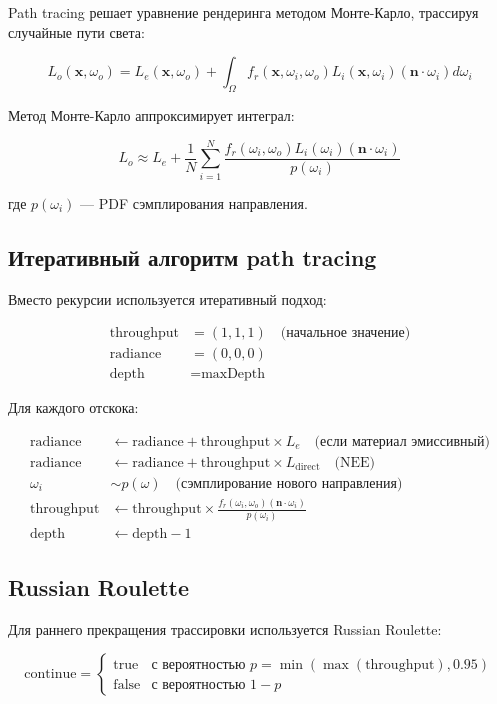 \documentclass[14pt, a4paper]{extarticle}
\begin{document}
Path tracing решает уравнение рендеринга методом Монте-Карло, трассируя случайные пути света:

\[
L_o(\mathbf{x}, \omega_o) = L_e(\mathbf{x}, \omega_o) + \int_{\Omega} f_r(\mathbf{x}, \omega_i, \omega_o) L_i(\mathbf{x}, \omega_i) (\mathbf{n} \cdot \omega_i) d\omega_i
\]

Метод Монте-Карло аппроксимирует интеграл:

\[
L_o \approx L_e + \frac{1}{N} \sum_{i=1}^{N} \frac{f_r(\omega_i, \omega_o) L_i(\omega_i) (\mathbf{n} \cdot \omega_i)}{p(\omega_i)}
\]

где $p(\omega_i)$ --- PDF сэмплирования направления.

\subsection{Итеративный алгоритм path tracing}

Вместо рекурсии используется итеративный подход:

\begin{align}
\text{throughput} &= (1, 1, 1) \quad \text{(начальное значение)} \\
\text{radiance} &= (0, 0, 0) \\
\text{depth} &= \text{maxDepth}
\end{align}

Для каждого отскока:

\begin{align}
\text{radiance} &\leftarrow \text{radiance} + \text{throughput} \times L_e \quad \text{(если материал эмиссивный)} \\
\text{radiance} &\leftarrow \text{radiance} + \text{throughput} \times L_{\text{direct}} \quad \text{(NEE)} \\
\omega_i &\sim p(\omega) \quad \text{(сэмплирование нового направления)} \\
\text{throughput} &\leftarrow \text{throughput} \times \frac{f_r(\omega_i, \omega_o) (\mathbf{n} \cdot \omega_i)}{p(\omega_i)} \\
\text{depth} &\leftarrow \text{depth} - 1
\end{align}

\subsection{Russian Roulette}

Для раннего прекращения трассировки используется Russian Roulette:

\[
\text{continue} = \begin{cases}
\text{true} & \text{с вероятностью } p = \min(\max(\text{throughput}), 0.95) \\
\text{false} & \text{с вероятностью } 1 - p
\end{cases}
\]
\end{document}
